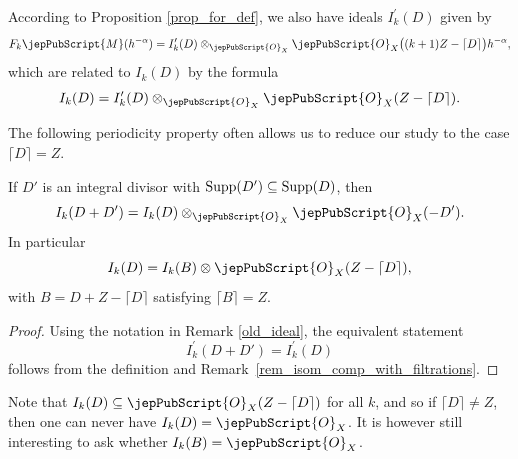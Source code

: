 \begin{remark}\label{old_ideal}
According to Proposition \ref{prop_for_def}, we also have ideals $I_k^\prime (D)$ given by
$$F_k\jepPubScript{M}(h^{-\alpha})=I_k^\prime (D)\otimes_{\jepPubScript{O}_X} \jepPubScript{O}_X\big((k+1)Z -\lceil D\rceil \big)h^{-\alpha},$$
which are related to $I_k(D)$ by the formula
$$I_k (D) = I_k^\prime (D) \otimes_{\jepPubScript{O}_X} \jepPubScript{O}_X (Z -\lceil D\rceil).$$
\end{remark}

The following periodicity property often allows us to reduce our study to the case  $\lceil D\rceil = Z$.

\begin{lemma}\label{periodicity}
If $D'$ is an integral divisor with ${\rm Supp}(D')\subseteq {\rm Supp}(D)$, then
$$I_k(D+D')=I_k(D)\otimes_{\jepPubScript{O}_X} \jepPubScript{O}_X (- D').$$
In particular 
$$I_k (D) = I_k (B) \otimes \jepPubScript{O}_X (Z - \lceil D \rceil),$$
with $B = D + Z - \lceil D \rceil$ satisfying $\lceil B \rceil = Z$.
\end{lemma}
\begin{proof}
Using the notation in Remark \ref{old_ideal}, the equivalent statement
$$I_k^\prime (D+D')=I_k^\prime (D)$$
follows from the definition and Remark~\ref{rem_isom_comp_with_filtrations}.
\end{proof}

\begin{remark}\label{always_nontrivial}
Note that $I_k (D) \subseteq \jepPubScript{O}_X (Z - \lceil D \rceil)$ for all $k$, and so if $\lceil D \rceil \neq Z$, then one can never have 
$I_k (D) = \jepPubScript{O}_X$. It is however still interesting to ask whether $I_k (B) = \jepPubScript{O}_X$.
\end{remark}










